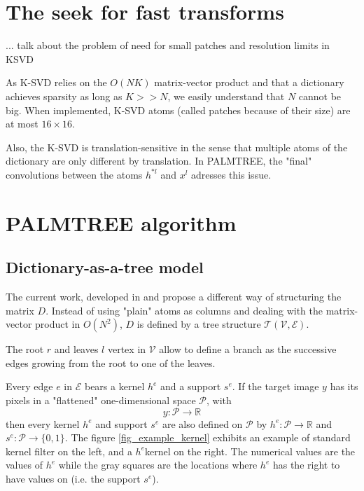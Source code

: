 \section{The seek for fast transforms}

... talk about the problem of need for small patches and resolution limits in KSVD %

As K-SVD relies on the $O(NK)$ matrix-vector product and that a dictionary achieves sparsity as long as $K >> N$, we easily understand that $N$ cannot be big. When implemented, K-SVD atoms (called patches because of their size) are at most $16 \times 16$.

Also, the K-SVD is translation-sensitive in the sense that multiple atoms of the dictionary are only different by translation. In PALMTREE, the "final" convolutions between the atoms $h^{*l}$ and $x^l$ adresses this issue.


\section{PALMTREE algorithm}

\subsection{Dictionary-as-a-tree model \label{sec_tree_model}}
The current work, developed in \cite{chabiron_toward_2015} and \cite{chabiron_optimization_2016} propose a different way of structuring the matrix $D$. Instead of using "plain" atoms as columns and dealing with the matrix-vector product in $O(N^2)$, $D$ is defined by a tree structure $\mathcal{T}(\mathcal{V},\mathcal{E})$. 

The root $r$ and leaves $l$ vertex in $\mathcal{V}$ allow to define a branch as the successive edges growing from the root to one of the leaves.

Every edge $e$ in $\mathcal{E}$ bears a kernel $h^e$ and a support $s^e$. If the target image $y$ has its pixels in a "flattened" one-dimensional space $\mathcal{P}$, with
$$y : \mathcal{P} \rightarrow \mathbb{R}$$
then every kernel $h^e$ and support $s^e$ are also defined on $\mathcal{P}$ by $h^e:\mathcal{P} \rightarrow \mathbb{R}$ and $s^e:\mathcal{P} \rightarrow \{0,1\}$. The figure \ref{fig_example_kernel} exhibits an example of standard kernel filter on the left, and a $h^e$kernel on the right. The numerical values are the values of $h^e$ while the gray squares are the locations where $h^e$ has the right to have values on (i.e. the support $s^e$).

